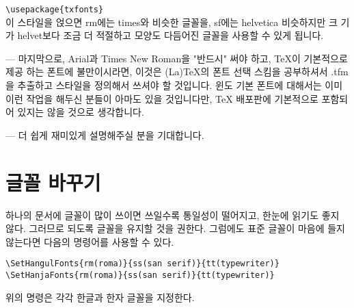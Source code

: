 			\verb|\usepackage{txfonts}|\\
			
			이 스타일을 얹으면 rm에는 times와 비슷한 글꼴을, sf에는 helvetica 비슷하지만 크
			기가 helvet보다 조금 더 적절하고 모양도 다듬어진 글꼴을 사용할 수 있게 됩니다. 
			
			---
			마지막으로, Arial과 Times New Roman을 "반드시" 써야 하고, TeX이 기본적으로 제공
			하는 폰트에 불만이시라면, 이것은 (La)TeX의 폰트 선택 스킴을 공부하셔서 .tfm을 
			추출하고 스타일을 정의해서 쓰셔야 할 것입니다. 
			윈도 기본 폰트에 대해서는 이미 이런 작업을 해두신 분들이 아마도 있을 것입니다만, 
			TeX 배포판에 기본적으로 포함되어 있지는 않을 것으로 생각합니다.
			
			---
			더 쉽게 재미있게 설명해주실 분을 기대합니다.













































	\newpage  \null
	\section{글꼴 바꾸기}

			하나의 문서에 글꼴이 많이 쓰이면 쓰일수록 통일성이 떨어지고, 
			한눈에 읽기도 좋지 않다. 그러므로 되도록 글꼴을 유지할 것을 권한다.
			그럼에도 표준 글꼴이 마음에 들지 않는다면 다음의 명령어를 사용할 수 있다.
			\begin{framed}
			\verb|\SetHangulFonts{rm(roma)}{ss(san serif)}{tt(typewriter)}|
			\verb|\SetHanjaFonts{rm(roma)}{ss(san serif)}{tt(typewriter)}|
			\end{framed}
			위의 명령은 각각 한글과 한자 글꼴을 지정한다. 
		
